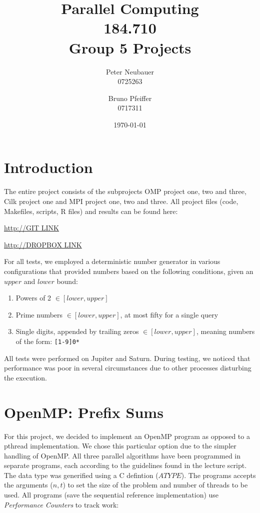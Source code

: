 \documentclass[11pt]{article}
\begin{document}
\title{Parallel Computing\\184.710\\Group 5 Projects}
\author{Peter Neubauer\\ 0725263 \and Bruno Pfeiffer \\ 0717311}
\date{\today}
\maketitle
\newpage
\tableofcontents

\newpage
\section{Introduction}

The entire project consists of the subprojects OMP project one, two and three, Cilk project one and MPI project one, two and three. All project files (code, Makefiles, scripts, R files) and results can be found here:

\begin{center}
\url{http://GIT LINK}

\url{http://DROPBOX LINK}
\end{center}

For all tests, we employed a deterministic number generator in various configurations that provided numbers based on the following conditions, given an $upper$ and $lower$ bound:
\begin{enumerate}
\item Powers of 2 $ \in [lower, upper]$
\item Prime numbers $\in [lower, upper]$, at most fifty for a single query
\item Single digits, appended by trailing zeros $\in [lower, upper]$, meaning numbers of the form: \verb=[1-9]0*=
\end{enumerate}
All tests were performed on Jupiter and Saturn. During testing, we noticed that performance was poor in several circumstances due to other processes disturbing the execution.

\newpage
\section{OpenMP: Prefix Sums}
For this project, we decided to implement an OpenMP program as opposed to a pthread implementation. We chose this particular option due to the simpler handling of OpenMP. All three parallel algorithms have been programmed in separate programs, each according to the guidelines found in the lecture script. The data type was generified using a C defintion ($ATYPE$). The programs accepts the arguments ($n, t$) to set the size of the problem and number of threads to be used.
All programs (save the sequential reference implementation) use \emph{Performance Counters} to track work:
\end{document}
